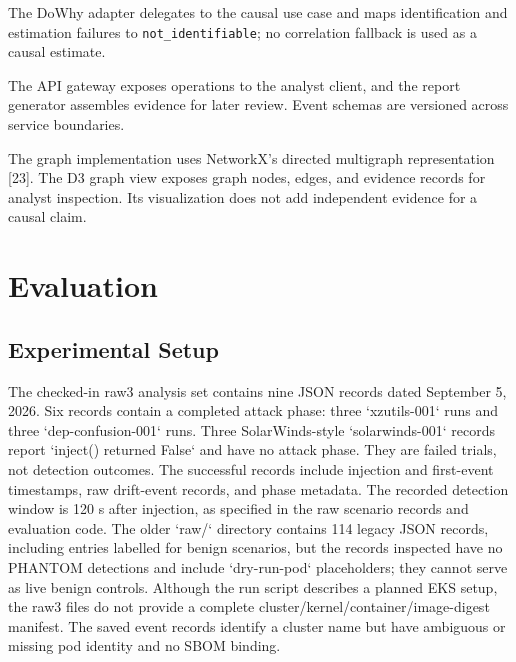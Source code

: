 \documentclass[conference]{IEEEtran}
\begin{document}
The DoWhy adapter delegates to the causal use case and maps identification and estimation failures to \texttt{not\_identifiable}; no correlation fallback is used as a causal estimate.

The API gateway exposes operations to the analyst client, and the report generator assembles evidence for later review. Event schemas are versioned across service boundaries.

The graph implementation uses NetworkX's directed multigraph representation [23]. The D3 graph view exposes graph nodes, edges, and evidence records for analyst inspection. Its visualization does not add independent evidence for a causal claim.

\section{Evaluation}
\subsection{Experimental Setup}
The checked-in raw3 analysis set contains nine JSON records dated September 5, 2026. Six records contain a completed attack phase: three `xzutils-001` runs and three `dep-confusion-001` runs. Three SolarWinds-style `solarwinds-001` records report `inject() returned False` and have no attack phase. They are failed trials, not detection outcomes. The successful records include injection and first-event timestamps, raw drift-event records, and phase metadata. The recorded detection window is 120 s after injection, as specified in the raw scenario records and evaluation code. The older `raw/` directory contains 114 legacy JSON records, including entries labelled for benign scenarios, but the records inspected have no PHANTOM detections and include `dry-run-pod` placeholders; they cannot serve as live benign controls. Although the run script describes a planned EKS setup, the raw3 files do not provide a complete cluster/kernel/container/image-digest manifest. The saved event records identify a cluster name but have ambiguous or missing pod identity and no SBOM binding.
\end{document}
